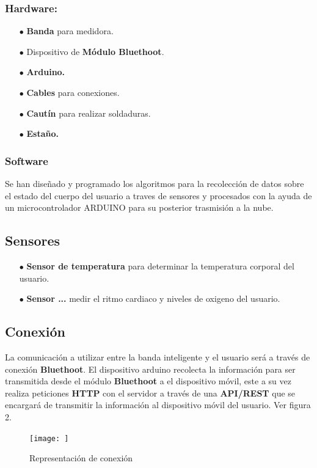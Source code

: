 \documentclass[osajnl,twocolumn,showpacs,superscriptaddress,10pt]{revtex4-1}
\begin{document}
\subsubsection{Hardware:}
\begin{itemize}
    \item[$\bullet$]\textbf{Banda} para medidora.
    \item[$\bullet$]Dispositivo de \textbf{Módulo Bluethoot}.
    \item[$\bullet$]\textbf{Arduino.}
    \item[$\bullet$]\textbf{Cables} para conexiones.
    \item[$\bullet$]\textbf{Cautín} para realizar soldaduras.
    \item[$\bullet$]\textbf{Estaño.}
\end{itemize}
\subsubsection{Software}
    Se han diseñado y programado los algoritmos para la recolección de datos sobre el estado del cuerpo del usuario a traves de sensores y procesados con la ayuda de un microcontrolador ARDUINO para su posterior trasmisión a la nube.
    
\subsection{Sensores}
\begin{itemize}
    \item[$\bullet$]\textbf{Sensor de temperatura} para determinar la temperatura corporal del usuario.
    \item[$\bullet$]\textbf{Sensor ...} medir el ritmo cardiaco y niveles de oxigeno del usuario.
\end{itemize}
\subsection{Conexión}
    La comunicación a utilizar entre la banda inteligente y el usuario será a través de conexión \textbf{Bluethoot}. El dispositivo arduino recolecta la información para ser transmitida desde el módulo \textbf{Bluethoot} a el dispositivo móvil, este a su vez realiza peticiones \textbf{HTTP} con el servidor a través de una \textbf{API/REST} que se encargará de transmitir la información al dispositivo móvil del usuario. Ver figura 2. \newline
\begin{figure} [H] \centering 
\caption{Representación de conexión}

\texttt{[image: ]} 
\end{figure}
\end{document}
